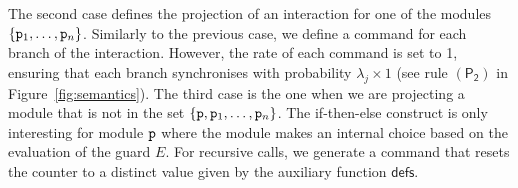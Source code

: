     The second case defines the projection of an interaction for one
    of the modules \( \{\mathtt{p}_1, \ldots, \mathtt{p}_n\} \). Similarly
    to the previous case, we define a command for each branch of the
    interaction. However, the rate of each command is set to 1,
    ensuring that each branch synchronises with probability
    \( \lambda_j \times 1 \) (see rule \( \mathsf{(P_2)} \) in
    Figure~\ref{fig:semantics}).
    The third case is the one when we are projecting a module that is
    not in the set $\{\mathtt{p}, \mathtt{p}_1,\ldots,\mathtt{p}_n\}$. %
    The if-then-else construct is only interesting for module
    $\mathtt{p}$ where the module makes an internal choice based on the
    evaluation of the guard $E$. %
    For recursive calls, we generate a command that resets the counter
    to a distinct value given by the auxiliary function
    $\textsf{defs}$. 

